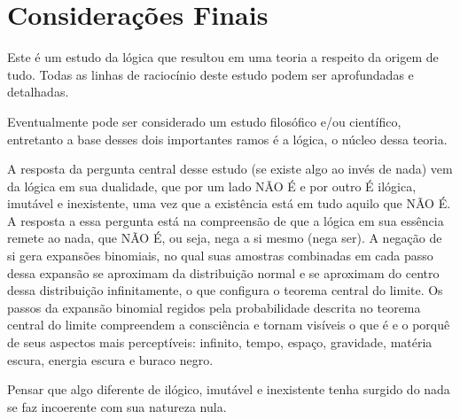 \section*{Considerações Finais}
Este é um estudo da lógica que resultou em uma teoria a respeito da origem de tudo. Todas as linhas de raciocínio deste estudo podem ser aprofundadas e detalhadas. 

Eventualmente pode ser considerado um estudo filosófico e/ou científico, entretanto a base desses dois importantes ramos é a lógica, o núcleo dessa teoria. 

A resposta da pergunta central desse estudo (se existe algo ao invés de nada) vem da lógica em sua dualidade, que por um lado NÃO É e por outro É ilógica, imutável e inexistente, uma vez que a existência está em tudo aquilo que NÃO É. A resposta a essa pergunta está na compreensão de que a lógica em sua essência remete ao nada, que NÃO É, ou seja, nega a si mesmo (nega ser). A negação de si gera expansões binomiais, no qual suas amostras combinadas em cada passo dessa expansão se aproximam da distribuição normal e se aproximam do centro dessa distribuição infinitamente, o que configura o teorema central do limite. Os passos da expansão binomial regidos pela probabilidade descrita no teorema central do limite compreendem a consciência e tornam visíveis o que é e o porquê de seus aspectos mais perceptíveis: infinito, tempo, espaço, gravidade, matéria escura, energia escura e buraco negro.

Pensar que algo diferente de ilógico, imutável e inexistente tenha surgido do nada se faz incoerente com sua natureza nula.